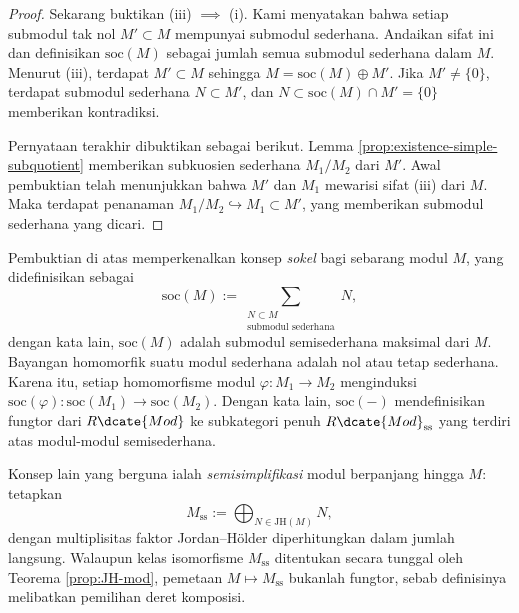 \begin{proof}
	Sekarang buktikan (iii) $\implies$ (i). Kami menyatakan bahwa setiap submodul tak nol $M' \subset M$ mempunyai submodul sederhana. Andaikan sifat ini dan definisikan $\text{soc}(M)$ sebagai jumlah semua submodul sederhana dalam $M$. Menurut (iii), terdapat $M' \subset M$ sehingga $M = \text{soc}(M) \oplus M'$. Jika $M' \neq \{0\}$, terdapat submodul sederhana $N \subset M'$, dan $N \subset \text{soc}(M) \cap M' = \{0\}$ memberikan kontradiksi.

	Pernyataan terakhir dibuktikan sebagai berikut. Lemma \ref{prop:existence-simple-subquotient} memberikan subkuosien sederhana $M_1/M_2$ dari $M'$. Awal pembuktian telah menunjukkan bahwa $M'$ dan $M_1$ mewarisi sifat (iii) dari $M$. Maka terdapat penanaman $M_1/M_2 \hookrightarrow M_1 \subset M'$, yang memberikan submodul sederhana yang dicari.
\end{proof}

Pembuktian di atas memperkenalkan konsep \emph{sokel} bagi sebarang modul $M$, yang didefinisikan sebagai
\[ \text{soc}(M) := \sum_{\substack{N \subset M \\ \text{submodul sederhana} }} N, \]
dengan kata lain, $\text{soc}(M)$ adalah submodul semisederhana maksimal dari $M$. Bayangan homomorfik suatu modul sederhana adalah nol atau tetap sederhana. Karena itu, setiap homomorfisme modul $\varphi: M_1 \to M_2$ menginduksi $\text{soc}(\varphi): \text{soc}(M_1) \to \text{soc}(M_2)$. Dengan kata lain, $\text{soc}(-)$ mendefinisikan fungtor dari $R\dcate{Mod}$ ke subkategori penuh $R\dcate{Mod}_{\text{ss}}$ yang terdiri atas modul-modul semisederhana.

Konsep lain yang berguna ialah \emph{semisimplifikasi} modul berpanjang hingga $M$: tetapkan
\[ M_\text{ss} := \bigoplus_{N \in \text{JH}(M)} N, \]
dengan multiplisitas faktor Jordan--Hölder diperhitungkan dalam jumlah langsung. Walaupun kelas isomorfisme $M_\text{ss}$ ditentukan secara tunggal oleh Teorema \ref{prop:JH-mod}, pemetaan $M \mapsto M_\text{ss}$ bukanlah fungtor, sebab definisinya melibatkan pemilihan deret komposisi.

